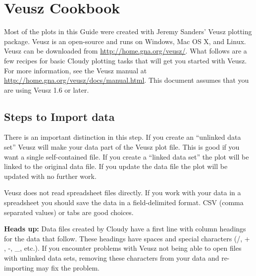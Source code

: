 

%





\section{Veusz Cookbook}
\label{sec:VeuszCookbook}

Most of the plots in this Guide were created with Jeremy Sanders' Veusz plotting package.
Veusz is an open-source and runs on Windows, Mac OS X,
and Linux. Veusz can be downloaded from \url{http://home.gna.org/veusz/}. What follows are a few recipes for basic Cloudy plotting tasks that will get you started with Veusz. For more information, see the Veusz manual at \url{http://home.gna.org/veusz/docs/manual.html}. This document assumes that you 
are using Veusz 1.6 or later.

\subsection{Steps to Import data}

There is an important distinction in this step.
If you create an ``unlinked data set'' Veusz will make your data part of the
Veusz plot file. 
This is good if you want a single self-contained file.
If you create a ``linked data set'' the plot will be linked to the original
data file.  If you update the data file the plot will be updated with no further work.

Veusz does not read spreadsheet files directly.
If you work with your data in a spreadsheet you should save the
data in a field-delimited format.
CSV (comma separated values) or tabs are good choices.

\textbf{Heads up:} Data files created by Cloudy have a first line with 
column headings for the data that follow. These headings have spaces and 
special characters (/, + , -, {\_}, etc.). If you encounter problems with 
Veusz not being able to open files with unlinked data sets, removing 
these characters from your data and re-importing may fix the problem.

